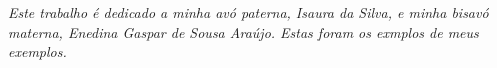 \begin{dedicatoria}
   \vspace*{\fill}
   \centering
   \noindent

   \textit{Este trabalho é dedicado a minha avó paterna, Isaura da Silva, e minha bisavó materna, Enedina Gaspar de Sousa Araújo. Estas foram os exmplos de meus exemplos.} \vspace*{\fill}
\end{dedicatoria}

